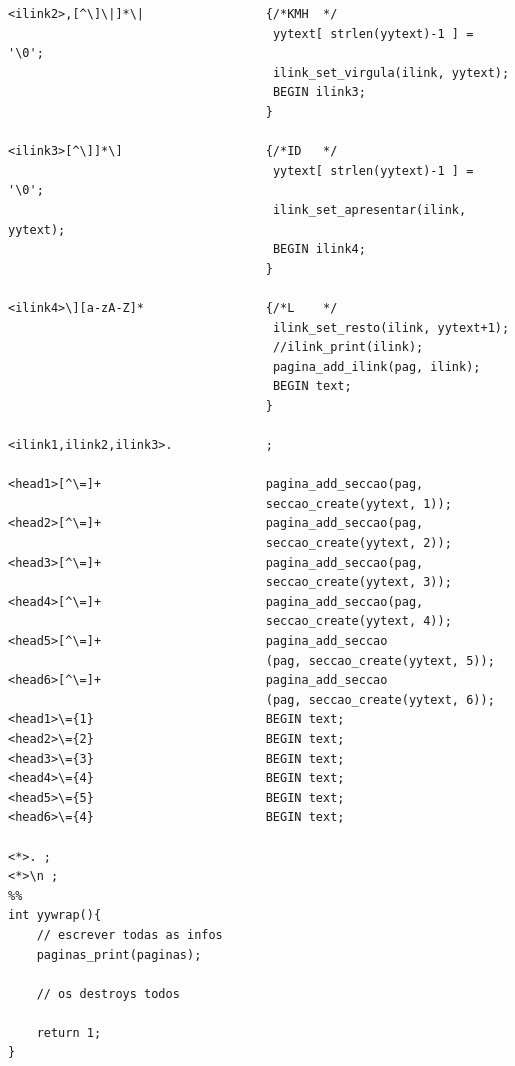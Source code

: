 \documentclass[11pt, a4paper, oneside]{article}
\begin{document}
\begin{verbatim}
<ilink2>,[^\]\|]*\|                 {/*KMH  */
                                     yytext[ strlen(yytext)-1 ] = '\0';
                                     ilink_set_virgula(ilink, yytext);
                                     BEGIN ilink3;
                                    }

<ilink3>[^\]]*\]                    {/*ID   */
                                     yytext[ strlen(yytext)-1 ] = '\0';
                                     ilink_set_apresentar(ilink, yytext);
                                     BEGIN ilink4;
                                    }

<ilink4>\][a-zA-Z]*                 {/*L    */
                                     ilink_set_resto(ilink, yytext+1);
                                     //ilink_print(ilink);
                                     pagina_add_ilink(pag, ilink);
                                     BEGIN text;
                                    }

<ilink1,ilink2,ilink3>.             ;

<head1>[^\=]+                       pagina_add_seccao(pag, 
                                    seccao_create(yytext, 1));
<head2>[^\=]+                       pagina_add_seccao(pag, 
                                    seccao_create(yytext, 2));
<head3>[^\=]+                       pagina_add_seccao(pag, 
                                    seccao_create(yytext, 3));
<head4>[^\=]+                       pagina_add_seccao(pag, 
                                    seccao_create(yytext, 4));
<head5>[^\=]+                       pagina_add_seccao
                                    (pag, seccao_create(yytext, 5));
<head6>[^\=]+                       pagina_add_seccao
                                    (pag, seccao_create(yytext, 6));
<head1>\={1}                        BEGIN text;
<head2>\={2}                        BEGIN text;
<head3>\={3}                        BEGIN text;
<head4>\={4}                        BEGIN text;
<head5>\={5}                        BEGIN text;
<head6>\={4}                        BEGIN text;

<*>. ;
<*>\n ;
%%
int yywrap(){
    // escrever todas as infos
    paginas_print(paginas);

    // os destroys todos

    return 1;
}
\end{verbatim}
\newpage
\end{document}
